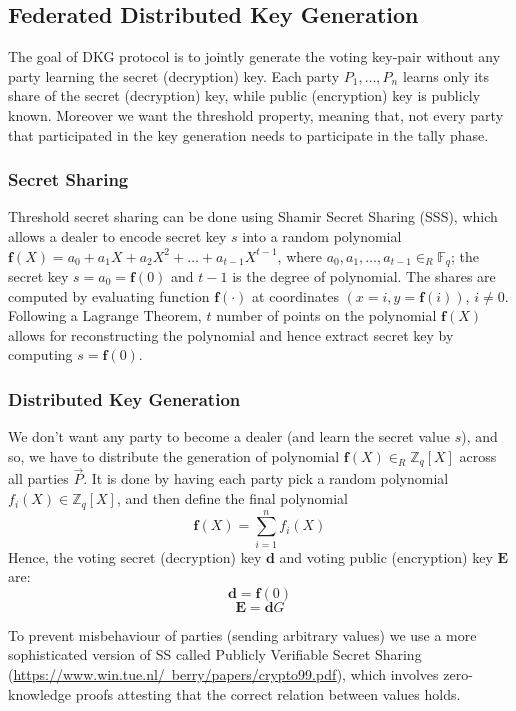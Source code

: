 \documentclass{article}
\begin{document}
\subsection{Federated Distributed Key Generation}
The goal of DKG protocol is to jointly generate the voting key-pair without any party learning the secret (decryption) key. Each party $P_1,\dots,P_n$ learns only its share of the secret (decryption) key, while public (encryption) key is publicly known. Moreover we want the threshold property, meaning that, not every party that participated in the key generation needs to participate in the tally phase.

\subsubsection*{Secret Sharing}

Threshold secret sharing can be done using Shamir Secret Sharing (SSS), which allows a dealer to encode secret key $s$ into a random polynomial $\mathbf{f}(X) = a_0 + a_1X + a_2X^2 + \dots + a_{t-1}X^{t-1}$, where $a_0,a_1,\dots,a_{t-1} \in_R \mathbb{F}_q$; the secret key $s=a_0=\mathbf{f}(0)$ and $t-1$ is the degree of polynomial. The shares are computed by evaluating function $\mathbf{f}(\cdot)$ at coordinates $(x=i,y=\mathbf{f}(i))$, $i \neq 0$. Following a Lagrange Theorem, $t$ number of points on the polynomial $\mathbf{f}(X)$ allows for reconstructing the polynomial and hence extract secret key by computing $s = \mathbf{f}(0)$.

\subsubsection*{Distributed Key Generation}
We don't want any party to become a dealer (and learn the secret value $s$), and so, we have to distribute the generation of polynomial $\mathbf{f}(X) \in_R \mathbb{Z}_q[X]$ across all parties $\vec{P}$. It is done by having each party pick a random polynomial $f_{i}(X) \in \mathbb{Z}_q[X]$, and then define the final polynomial \[\mathbf{f}(X)=\sum_{i=1}^{n}f_i(X)\] Hence, the voting secret (decryption) key $\mathbf{d}$ and voting public (encryption) key $\mathbf{E}$ are: $$\mathbf{d}=\mathbf{f}(0)$$ $$\mathbf{E}=\mathbf{d} G$$ 

To prevent misbehaviour of parties (sending arbitrary values) we use a more sophisticated version of SS called Publicly Verifiable Secret Sharing (\href{PVSS}{https://www.win.tue.nl/~berry/papers/crypto99.pdf}), which involves zero-knowledge proofs attesting that the correct relation between values holds.
\end{document}
